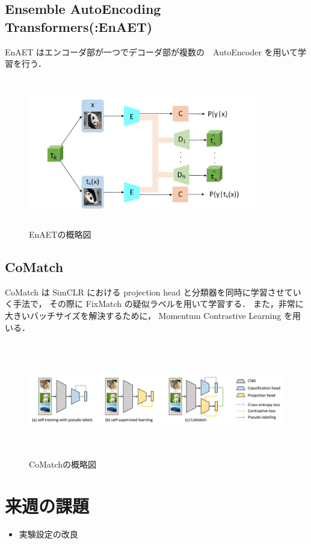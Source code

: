 \documentclass[twocolumn]{jarticle}     %
\begin{document}
\subsection{Ensemble AutoEncoding Transformers(:EnAET)}
EnAET はエンコーダ部が一つでデコーダ部が複数の　AutoEncoder を用いて学習を行う．
\begin{figure}[h]
	\begin{center}
		\vspace*{-3mm}
		\hspace*{-12mm}
		\includegraphics[height=65mm,width=100mm]{EnAET.png}
		\caption{EnAETの概略図\label{fi:}}
	\end{center}
\end{figure}

\subsection{CoMatch}
CoMatch は SimCLR における projection head と分類器を同時に学習させていく手法で，
その際に FixMatch の疑似ラベルを用いて学習する．
また，非常に大きいバッチサイズを解決するために， Momentum Contrastive Learning を用いる．

\begin{figure}[h]
	\begin{center}
		\vspace*{-3mm}
		\hspace*{-12mm}
		\includegraphics[height=50mm,width=200mm]{CoMatch.png}
		\caption{CoMatchの概略図\label{i:}}
	\end{center}
\end{figure}

\section{来週の課題}
\begin{itemize}
	\item 実験設定の改良
\end{itemize}
\end{document}
